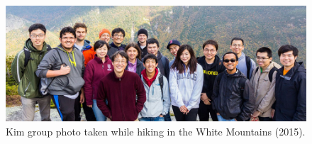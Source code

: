 \newpage

\begin{figure}
  \vspace{20pt}
  \centering
  \captionsetup{justification=centering}
  \includegraphics[width=\textwidth]{endmatter/group.jpg}
  \caption*{Kim group photo taken while hiking in the White Mountains (2015).}
\end{figure}
